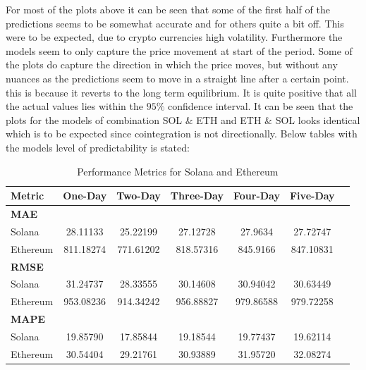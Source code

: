 \noindent For most of the plots above it can be seen that some of the first half of the predictions seems to be somewhat accurate and for others quite a bit off. This were to be expected, due to crypto currencies high volatility. Furthermore the models seem to only capture the price movement at start of the period. Some of the plots do capture the direction in which the price moves, but without any nuances as the predictions seem to move in a straight line after a certain point. this is because it reverts to the long term equilibrium. It is quite positive that all the actual values lies within the $95\%$ confidence interval. It can be seen that the plots for the models of combination SOL \& ETH and ETH \& SOL looks identical which is to be expected since cointegration is not directionally. Below tables with the models level of predictability is stated:

\begin{table}[H]
\centering
\caption{Performance Metrics for Solana and Ethereum}
\begin{tabular}{lcccccc}
\toprule
\textbf{Metric} & \textbf{One-Day} & \textbf{Two-Day} & \textbf{Three-Day} & \textbf{Four-Day} & \textbf{Five-Day} \\
\midrule
\textbf{MAE} & & & & & \\
Solana        & 28.11133 & 25.22199 & 27.12728 & 27.9634 & 27.72747 \\
Ethereum      & 811.18274 & 771.61202 & 818.57316 & 845.9166 & 847.10831 \\
\midrule
\textbf{RMSE} & & & & & \\
Solana        & 31.24737 & 28.33555 & 30.14608 & 30.94042 & 30.63449 \\
Ethereum      & 953.08236 & 914.34242 & 956.88827 & 979.86588 & 979.72258 \\
\midrule
\textbf{MAPE} & & & & & \\
Solana        & 19.85790 & 17.85844 & 19.18544 & 19.77437 & 19.62114 \\
Ethereum      & 30.54404 & 29.21761 & 30.93889 & 31.95720 & 32.08274 \\
\bottomrule
\end{tabular}
\end{table}

